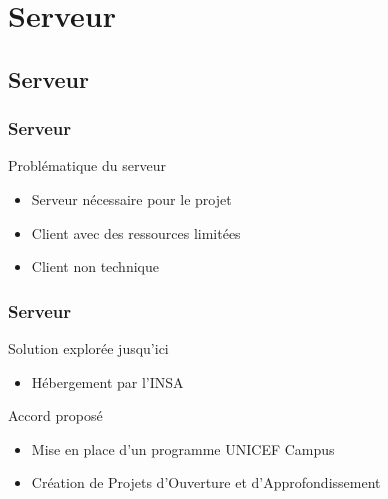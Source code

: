 

\speaker{\Matthieu}
\section{Serveur}
\subsection{Serveur}

\begin{frame}
	\frametitle{Serveur}
	\begin{block}{Problématique du serveur}
      \begin{itemize}
        \item Serveur nécessaire pour le projet
        \item Client avec des ressources limitées
        \item Client non technique
      \end{itemize}
     \end{block}
\end{frame}

\begin{frame}
	\frametitle{Serveur}
	\begin{block}{Solution explorée jusqu'ici}
	\begin{itemize}	
    \item Hébergement par l'INSA
    \end{itemize}
	\end{block}
    
    \begin{block}{Accord proposé}
	\begin{itemize}
		\item Mise en place d'un programme UNICEF Campus
		\item Création de Projets d’Ouverture et d’Approfondissement %
	\end{itemize}
	\end{block}
\end{frame}

